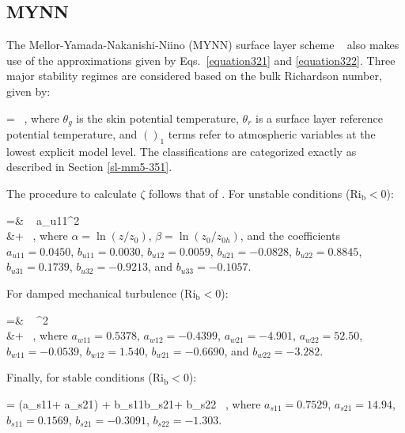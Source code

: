 \subsection{MYNN}
\label{sl-mynn-353}

The Mellor-Yamada-Nakanishi-Niino (MYNN) surface layer scheme ~\citep{NN01, NN04, NN06} also makes use of the  \citet{Dyer} approximations given by Eqs.~\eqref{equation321} and \eqref{equation322}. Three major stability regimes are considered based on the bulk Richardson number, given by:

\be
{} =  \, , 
\label{equation327}
\ee
\noindent
 where $\theta_g$ is the skin potential temperature, $\theta_r$ is a surface layer reference potential temperature, and $()_1$ terms refer to atmospheric variables at the lowest explicit model level. The classifications are categorized exactly as described in Section \autoref{sl-mm5-351}.

The procedure to calculate $\zeta$ follows that of  \citet{Li2010}. For unstable conditions ($\mathrm{Ri_b} < 0$):

\bal
\zeta  =&  \mbox{ } a_{u11}\alpha {}^2 \nonumber \\
&+   \, ,\label{equation328}
\eal
\noindent
 where $\alpha = \ln(z/z_0)$, $\beta = \ln(z_0/z_{0h})$, and the coefficients $a_{u11} = 0.0450$, $b_{u11} = 0.0030$, $b_{u12} = 0.0059$, $b_{u21} = -0.0828$, $b_{u22} = 0.8845$, $b_{u31} = 0.1739$, $b_{u32} = -0.9213$, and $b_{u33} = -0.1057$. 

For damped mechanical turbulence ($\mathrm{Ri_b} < 0$):

\bal
\zeta =& \mbox{ }  ^2 \nonumber\\ &+    \, ,\label{equation329}
\eal
\noindent
 where $a_{w11} = 0.5378$, $a_{w12} = -0.4399$, $a_{w21} = -4.901$, $a_{w22} = 52.50$, $b_{w11} = -0.0539$, $b_{w12} = 1.540$, $b_{w21} = -0.6690$, and $b_{w22} = -3.282$. 

Finally, for stable conditions ($\mathrm{Ri_b} < 0$):

\be
\zeta = \left(a_{s11}\alpha + a_{s21}\right) + b_{s11}\alpha b_{s21}\beta + b_{s22} \, , \label{equation330}
\ee
\noindent
 where $a_{s11} = 0.7529$, $a_{s21} = 14.94$, $b_{s11} = 0.1569$, $b_{s21} = -0.3091$, $b_{s22} = -1.303$.

